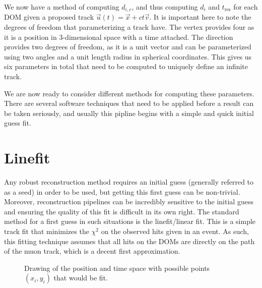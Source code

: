 We now have a method of computing $d_{i,c}$, and thus computing $d_{i}$ and $t_{\text{res}}$ for each DOM given a proposed track $\vec{u}(t) = \vec{x} + ct\vec{v}$. It is important here to note the degrees of freedom that parameterizing a track have. The vertex provides four as it is a position in 3-dimensional space with a time attached. The direction provides two degrees of freedom, as it is a unit vector and can be parameterized using two angles and a unit length radius in spherical coordinates. This gives us six parameters in total that need to be computed to uniquely define an infinite track. 

We are now ready to consider different methods for computing these parameters. There are several software techniques that need to be applied before a result can be taken seriously, and usually this pipline begins with a simple and quick initial guess fit. 

\section{Linefit}

Any robust reconstruction method requires an initial guess (generally referred to as a seed) in order to be used, but getting this first guess can be non-trivial. Moreover, reconstruction pipelines can be incredibly sensitive to the initial guess and ensuring the quality of this fit is difficult in its own right. The standard method for a first guess in such situations is the linefit/linear fit. This is a simple track fit that minimizes the $\chi^{2}$ on the observed hits given in an event. As such, this fitting technique assumes that all hits on the DOMs are directly on the path of the muon track, which is a decent first approximation.

\begin{figure}
  \centering
  \caption{Drawing of the position and time space with possible points $(x_{i},y_{i})$ that would be fit.}
  \label{fig:linfit}
\end{figure}

